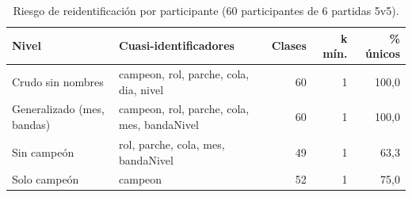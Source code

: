 \begin{table}[H]
\centering
\small
\caption{Riesgo de reidentificación por participante (60 participantes de 6 partidas 5v5).}
\label{tab:riesgo}
\begin{tabular}{p{3.2cm}p{6.2cm}rrr}
\toprule
Nivel & Cuasi-identificadores & Clases & k mín. & \% únicos \\
\midrule
Crudo sin nombres & campeon, rol, parche, cola, dia, nivel & 60 & 1 & 100,0 \\
Generalizado (mes, bandas) & campeon, rol, parche, cola, mes, bandaNivel & 60 & 1 & 100,0 \\
Sin campeón & rol, parche, cola, mes, bandaNivel & 49 & 1 & 63,3 \\
Solo campeón & campeon & 52 & 1 & 75,0 \\
\bottomrule
\end{tabular}
\end{table}
